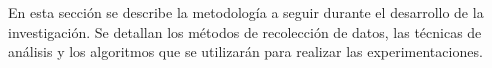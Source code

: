 En esta sección se describe la metodología a seguir durante el desarrollo de la investigación. Se detallan los métodos de recolección de datos, las técnicas de análisis y los algoritmos que se utilizarán para realizar las experimentaciones.
\cite{rayed2024deep}
